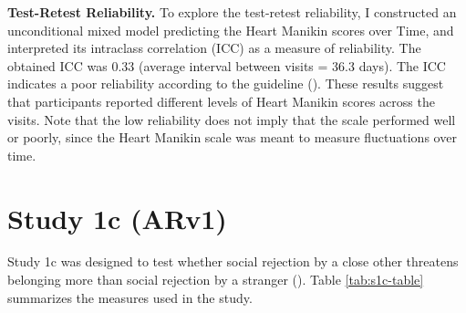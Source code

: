 \documentclass[
]{udthesis}
\begin{document}
\textbf{Test-Retest Reliability.} To explore the test-retest reliability, I
constructed an unconditional mixed model predicting the Heart Manikin
scores over Time, and interpreted its intraclass correlation
(ICC) as a measure of reliability. The obtained ICC was
0.33 (average interval between visits =
36.3 days). The ICC indicates a poor reliability
according to the guideline (). These results suggest that
participants reported different levels of Heart Manikin scores across
the visits. Note that the low reliability does not imply that the scale
performed well or poorly, since the Heart Manikin scale was meant to
measure fluctuations over time.

\section{Study 1c (ARv1)}\label{study-1c-arv1}

Study 1c was designed to test whether social rejection by a close other
threatens belonging more than social rejection by a stranger
(). Table \ref{tab:s1c-table} summarizes the measures used
in the study.
\end{document}

